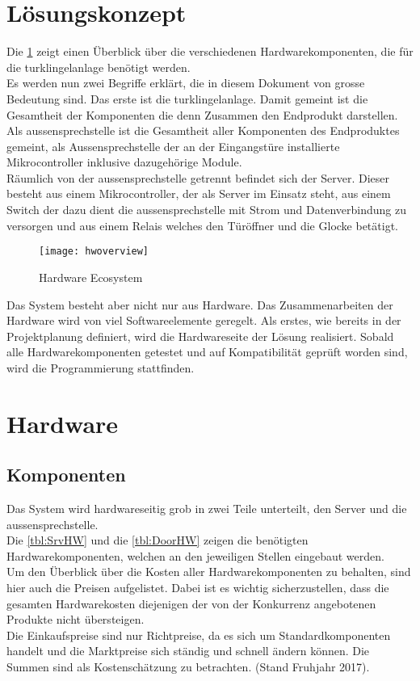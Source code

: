 \section{Lösungskonzept}
\label{sec:lösungskonzept}
Die \cref{fig:hwoverview} zeigt einen Überblick über die verschiedenen Hardwarekomponenten, die für die \gls{turklingelanlage} benötigt werden.
\\
Es werden nun zwei Begriffe erklärt, die in diesem Dokument von grosse Bedeutung sind. Das erste ist die \gls{turklingelanlage}. Damit gemeint ist die Gesamtheit der Komponenten die denn Zusammen den Endprodukt darstellen.
\\
Als \gls{aussensprechstelle} ist die Gesamtheit aller Komponenten des Endproduktes gemeint, als Aussensprechstelle der an der Eingangstüre installierte Mikrocontroller inklusive dazugehörige Module.
\\
Räumlich von der \gls{aussensprechstelle} getrennt befindet sich der Server. Dieser besteht aus einem Mikrocontroller, der als Server im Einsatz steht, aus einem Switch der dazu dient die \gls{aussensprechstelle} mit Strom und Datenverbindung zu versorgen und aus einem Relais welches den Türöffner und die Glocke betätigt.
\begin{figure}[htb!]
	\begin{center}
		\texttt{[image: hwoverview]}
		\caption[Hardware Ecosystem]{Hardware Ecosystem}
		\label{fig:hwoverview}
	\end{center}
\end{figure}
Das System besteht aber nicht nur aus Hardware. Das Zusammenarbeiten der Hardware wird von viel Softwareelemente geregelt. Als erstes, wie bereits in der Projektplanung definiert, wird die Hardwareseite der Lösung realisiert. Sobald alle Hardwarekomponenten getestet und auf Kompatibilität geprüft worden sind, wird die Programmierung stattfinden.
\newpage

\section{Hardware}
\label{sec:chapterexample}
\subsection{Komponenten}
Das System wird hardwareseitig grob in zwei Teile unterteilt, den Server und die \gls{aussensprechstelle}.
\\
Die \cref{tbl:SrvHW} und die \cref{tbl:DoorHW} zeigen die benötigten Hardwarekomponenten, welchen an den jeweiligen Stellen eingebaut werden.
\\
Um den Überblick über die Kosten aller Hardwarekomponenten zu behalten, sind hier auch die Preisen aufgelistet. Dabei ist es wichtig sicherzustellen, dass die gesamten Hardwarekosten diejenigen der von der Konkurrenz angebotenen Produkte nicht übersteigen.
\\
Die Einkaufspreise sind nur Richtpreise, da es sich um Standardkomponenten handelt und die Marktpreise sich ständig und schnell ändern können. Die Summen sind als Kostenschätzung zu betrachten. (Stand Fruhjahr 2017).

